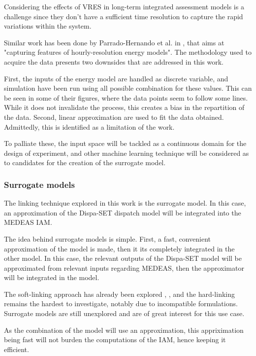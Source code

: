Considering the effects of VRES in long-term integrated assessment models is a challenge since they don't have a sufficient time resolution to capture the rapid variations within the system.

Similar work has been done by Parrado-Hernando et al. in \cite{Hernando2022}, that aims at "capturing features of hourly-resolution energy models". The methodology used to acquire the data presents two downsides that are addressed in this work.

First, the inputs of the energy model are handled as discrete variable, and simulation have been run using all possible combination for these values. This can be seen in some of their figures, where the data points seem to follow some lines. While it does not invalidate the process, this creates a bias in the repartition of the data. Second, linear approximation are used to fit the data obtained. Admittedly, this is identified as a limitation of the work.

To palliate these, the input space will be tackled as a continuous domain for the design of experiment, and other machine learning technique will be considered as to candidates for the creation of the surrogate model.

\subsubsection{Surrogate models}

The linking technique explored in this work is the surrogate model. In this case, an approximation of the Dispa-SET dispatch model will be integrated into the MEDEAS IAM. 

The idea behind surrogate models is simple. First, a fast, convenient approximation of the model is made, then it its completely integrated in the other model. In this case, the relevant outputs of the Dispa-SET model will be approximated from relevant inputs regarding MEDEAS, then the approximator will be integrated in the model.

The soft-linking approach has already been explored \cite{Brinkerink2022-softlink}, \cite{DEane2012-softlink}, and the hard-linking remains the hardest to investigate, notably due to incompatible formulations. Surrogate models are still unexplored and are of great interest for this use case.

As the combination of the model will use an approximation, this appriximation being fast will not burden the computations of the IAM, hence keeping it efficient.

